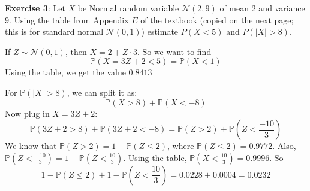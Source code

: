 \documentclass{article}
\begin{document}
\newpage

\textbf{Exercise 3}: Let $X$ be Normal random variable $\mathcal{N}(2, 9)$ of mean $2$ and variance $9$. Using the table from Appendix $E$ of the textbook (copied on the next page; this is for standard normal $\mathcal{N}(0, 1)$) estimate $P(X < 5)$ and $P(\lvert X \rvert > 8)$.
    \begin{answer}
        If $Z \sim \mathcal{N}(0, 1)$, then $X = 2 + Z \cdot 3$. So we want to find 
            \begin{equation*}
                \mathbb{P}(X = 3Z + 2 < 5) = \mathbb{P}(X < 1)
            \end{equation*}
        Using the table, we get the value $0.8413$

        For $\mathbb{P}(\lvert X \rvert > 8)$, we can split it as:
            \begin{equation*}
                \mathbb{P}(X > 8) + \mathbb{P}(X < -8)
            \end{equation*}
        Now plug in $X = 3Z + 2$:
            \begin{equation*}
                \mathbb{P}(3Z + 2 > 8) + \mathbb{P}(3Z + 2 < -8) = \mathbb{P}(Z > 2) + \mathbb{P}(Z < \frac{-10}{3})
            \end{equation*}
        We know that $\mathbb{P}(Z > 2) = 1 - \mathbb{P}(Z \leq 2)$, where $\mathbb{P}(Z \leq 2) = 0.9772$. Also, $\mathbb{P}(Z < \frac{-10}{3}) = 1 - \mathbb{P}(Z < \frac{10}{3})$. Using the table, $\mathbb{P}(X < \frac{10}{3}) = 0.9996$. So
            \begin{equation*}
                1 - \mathbb{P}(Z \leq 2) + 1 - \mathbb{P}(Z < \dfrac{10}{3}) = 0.0228 + 0.0004 = 0.0232
            \end{equation*}
    \end{answer}

\newpage
\end{document}
